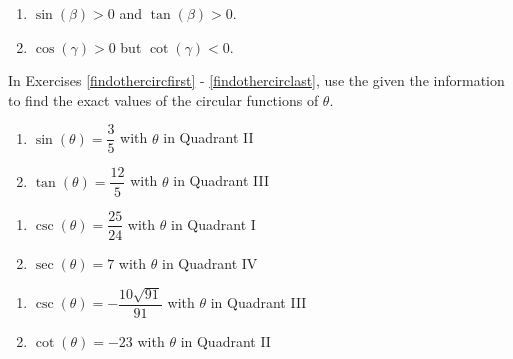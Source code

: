 \documentclass{ximera}
\begin{document}
\begin{multicols}{2}
\begin{enumerate}
\setcounter{enumi}{\value{HW}}

\item  $\sin(\beta) > 0$ and $\tan(\beta) > 0$.

\item  \label{whereisanglelast} $\cos(\gamma) > 0$ but $\cot(\gamma) < 0$.

\setcounter{HW}{\value{enumi}}
\end{enumerate}
\end{multicols}


In Exercises \ref{findothercircfirst} - \ref{findothercirclast}, use the given the information to find the exact values of the circular functions of $\theta$.

\begin{multicols}{2}

\begin{enumerate}

\setcounter{enumi}{\value{HW}}

\item $\sin(\theta) = \dfrac{3}{5}$ with $\theta$ in Quadrant II \label{findothercircfirst}
\item $\tan(\theta) = \dfrac{12}{5}$ with $\theta$ in Quadrant III

\setcounter{HW}{\value{enumi}}

\end{enumerate}

\end{multicols}

\begin{multicols}{2}

\begin{enumerate}

\setcounter{enumi}{\value{HW}}

\item $\csc(\theta) = \dfrac{25}{24}$ with $\theta$ in Quadrant I
\item $\sec(\theta) = 7$ with $\theta$ in Quadrant IV 

\setcounter{HW}{\value{enumi}}

\end{enumerate}

\end{multicols}

\begin{multicols}{2}

\begin{enumerate}

\setcounter{enumi}{\value{HW}}

\item $\csc(\theta) = -\dfrac{10\sqrt{91}}{91}$ with $\theta$ in Quadrant III
\item $\cot(\theta) = -23$ with $\theta$ in Quadrant II 

\setcounter{HW}{\value{enumi}}

\end{enumerate}

\end{multicols}
\end{document}
